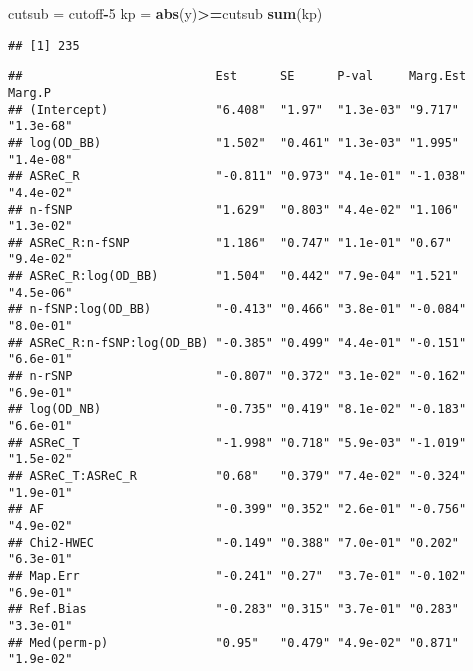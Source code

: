 \documentclass[]{article}
\newenvironment{Shaded}{\begin{snugshade}}{\end{snugshade}}
\newcommand{\KeywordTok}[1]{\textcolor[rgb]{0.13,0.29,0.53}{\textbf{#1}}}
\newcommand{\DecValTok}[1]{\textcolor[rgb]{0.00,0.00,0.81}{#1}}
\newcommand{\StringTok}[1]{\textcolor[rgb]{0.31,0.60,0.02}{#1}}
\newcommand{\OperatorTok}[1]{\textcolor[rgb]{0.81,0.36,0.00}{\textbf{#1}}}
\newcommand{\NormalTok}[1]{#1}
\begin{document}
\begin{Shaded}
\begin{Highlighting}[]
\NormalTok{cutsub =}\StringTok{ }\NormalTok{cutoff}\OperatorTok{-}\DecValTok{5}
\NormalTok{kp =}\StringTok{ }\KeywordTok{abs}\NormalTok{(y)}\OperatorTok{>=}\NormalTok{cutsub}
\KeywordTok{sum}\NormalTok{(kp)}
\end{Highlighting}
\end{Shaded}

\begin{verbatim}
## [1] 235
\end{verbatim}

\begin{Shaded}
\end{Shaded}

\begin{verbatim}
##                           Est      SE      P-val     Marg.Est Marg.P   
## (Intercept)               "6.408"  "1.97"  "1.3e-03" "9.717"  "1.3e-68"
## log(OD_BB)                "1.502"  "0.461" "1.3e-03" "1.995"  "1.4e-08"
## ASReC_R                   "-0.811" "0.973" "4.1e-01" "-1.038" "4.4e-02"
## n-fSNP                    "1.629"  "0.803" "4.4e-02" "1.106"  "1.3e-02"
## ASReC_R:n-fSNP            "1.186"  "0.747" "1.1e-01" "0.67"   "9.4e-02"
## ASReC_R:log(OD_BB)        "1.504"  "0.442" "7.9e-04" "1.521"  "4.5e-06"
## n-fSNP:log(OD_BB)         "-0.413" "0.466" "3.8e-01" "-0.084" "8.0e-01"
## ASReC_R:n-fSNP:log(OD_BB) "-0.385" "0.499" "4.4e-01" "-0.151" "6.6e-01"
## n-rSNP                    "-0.807" "0.372" "3.1e-02" "-0.162" "6.9e-01"
## log(OD_NB)                "-0.735" "0.419" "8.1e-02" "-0.183" "6.6e-01"
## ASReC_T                   "-1.998" "0.718" "5.9e-03" "-1.019" "1.5e-02"
## ASReC_T:ASReC_R           "0.68"   "0.379" "7.4e-02" "-0.324" "1.9e-01"
## AF                        "-0.399" "0.352" "2.6e-01" "-0.756" "4.9e-02"
## Chi2-HWEC                 "-0.149" "0.388" "7.0e-01" "0.202"  "6.3e-01"
## Map.Err                   "-0.241" "0.27"  "3.7e-01" "-0.102" "6.9e-01"
## Ref.Bias                  "-0.283" "0.315" "3.7e-01" "0.283"  "3.3e-01"
## Med(perm-p)               "0.95"   "0.479" "4.9e-02" "0.871"  "1.9e-02"
\end{verbatim}

\begin{Shaded}
\end{Shaded}
\end{document}
